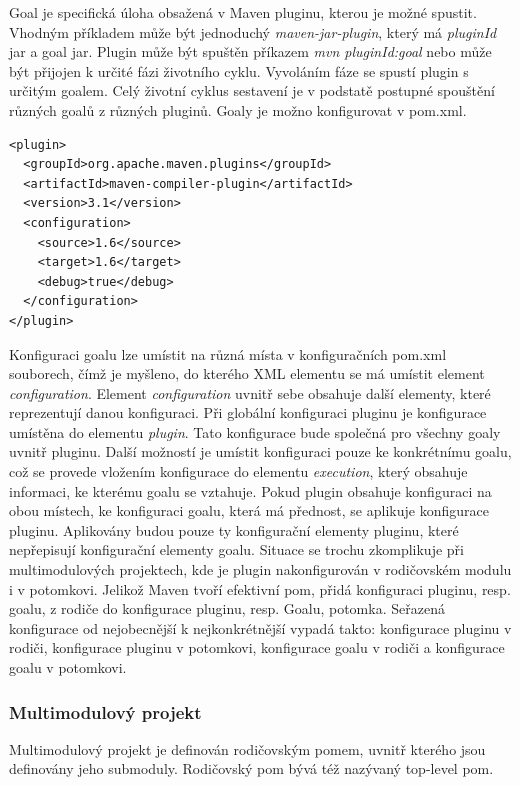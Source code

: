 \documentclass[11pt,twoside,a4paper]{book}
\begin{document}
Goal je specifická úloha obsažená v Maven pluginu, kterou je možné spustit.
Vhodným příkladem může být jednoduchý {\em maven-jar-plugin}, který má {\em
pluginId} jar a goal jar. Plugin může být spuštěn příkazem {\em mvn
pluginId:goal} nebo může být přijojen k určité fázi životního cyklu.
Vyvoláním fáze se spustí plugin s určitým goalem. Celý životní cyklus sestavení
je v podstatě postupné spouštění různých goalů z různých pluginů. Goaly je možno
konfigurovat v pom.xml.

\begin{lstlisting}[frame=single,caption={Ukázka konfigurace v pluginu}]
<plugin>
  <groupId>org.apache.maven.plugins</groupId>
  <artifactId>maven-compiler-plugin</artifactId>
  <version>3.1</version>
  <configuration>
    <source>1.6</source>
    <target>1.6</target>
    <debug>true</debug>
  </configuration>
</plugin>
\end{lstlisting}

Konfiguraci goalu lze umístit na různá místa v konfiguračních pom.xml souborech,
čímž je myšleno, do kterého XML elementu se má umístit element {\em
configuration}.
Element {\em configuration} uvnitř sebe obsahuje další elementy, které
reprezentují danou konfiguraci. Při globální konfiguraci pluginu je konfigurace
umístěna do elementu {\em plugin}. Tato konfigurace bude společná pro všechny
goaly uvnitř pluginu. Další možností je umístit konfiguraci pouze ke konkrétnímu
goalu, což se provede vložením konfigurace do elementu {\em execution}, který
obsahuje informaci, ke kterému goalu se vztahuje. Pokud plugin obsahuje konfiguraci na
obou místech, ke konfiguraci goalu, která má přednost, se aplikuje konfigurace
pluginu.
Aplikovány budou pouze ty konfigurační elementy pluginu, které nepřepisují
konfigurační elementy goalu. Situace se trochu zkomplikuje při multimodulových
projektech, kde je plugin nakonfigurován v rodičovském modulu i v potomkovi.
Jelikož Maven tvoří efektivní pom, přidá konfiguraci pluginu, resp. goalu, z
rodiče do konfigurace pluginu, resp. Goalu, potomka.
Seřazená konfigurace od nejobecnější k nejkonkrétnější vypadá takto: konfigurace
pluginu v rodiči, konfigurace pluginu v potomkovi, konfigurace goalu v rodiči a
konfigurace goalu v potomkovi.

\subsubsection{Multimodulový projekt}

Multimodulový projekt je definován rodičovským pomem, uvnitř kterého jsou definovány
jeho submoduly. Rodičovský pom bývá též nazývaný top-level pom.
\end{document}
